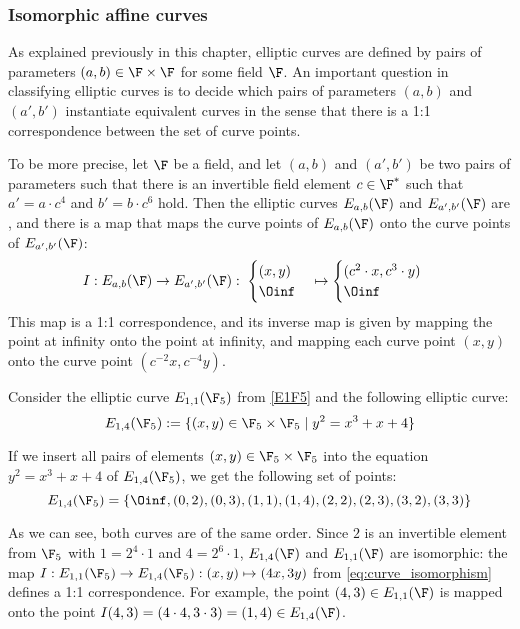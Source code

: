 \subsubsection{Isomorphic affine  curves}
\label{sec:isomorphic_curves} As explained previously in this chapter, elliptic curves are defined by pairs of parameters $(a, b)\in \F\times \F$ for some field $\F$. An important question in classifying elliptic curves is to decide which pairs of parameters $(a,b)$ and $(a',b')$ instantiate equivalent curves in the sense that there is a 1:1 correspondence between the set of curve points.

To be more precise, let $\F$ be a field, and let $(a,b)$ and $(a',b')$ be two pairs of parameters such that there is an invertible field element $c\in \F^*$ such that $a' = a\cdot c^4$ and $b' = b\cdot c^6$ hold. Then the elliptic curves $E_{a,b}(\F)$ and $E_{a',b'}(\F)$ are , and there is a map that maps the curve points of $E_{a,b}(\F)$ onto the curve points of $E_{a',b'}(\F)$:
\begin{equation}
\label{eq:curve_isomorphism}
I: E_{a,b}(\F) \to E_{a',b'}(\F):\; \begin{cases}(x,y)\\\Oinf\end{cases}
\mapsto \begin{cases}(c^2\cdot x,c^3\cdot y)\\\Oinf\end{cases}
\end{equation}
This map is a 1:1 correspondence, and its inverse map is given by mapping the point at infinity onto the point at infinity, and mapping each curve point $(x,y)$ onto the curve point $(c^{-2}x,c^{-4}y)$.
\begin{example}
\label{ex:isomorphic_E1F5}
 Consider the  elliptic curve $E_{1,1}(\F_5)$ from \examplename{} \ref{E1F5} and the following elliptic curve:
\begin{equation}
E_{1,4}(\F_5):= \{(x,y)\in \F_5\times \F_5 \; | \; y^2 = x^3 + x + 4 \}
\end{equation}

If we insert all pairs of elements $(x,y)\in \F_5\times \F_5$ into the  equation $y^2 = x^3 + x + 4$ of $E_{1,4}(\F_5)$, we get the following set of points:
\begin{equation}
E_{1,4}(\F_5) = \{
\Oinf, (0,2), (0,3), (1,1), (1,4), (2,2), (2,3), (3,2), (3,3)\}
\end{equation}

As we can see, both curves are of the same order. Since $2$ is an invertible element from $\F_5$ with $1 = 2^4\cdot 1$ and $4=2^6\cdot 1$, $E_{1,4}(\F)$ and $E_{1,1}(\F)$ are isomorphic: the map $I: E_{1,1}(\F_5)\to E_{1,4}(\F_5): (x,y)\mapsto (4x,3y)$ from \ref{eq:curve_isomorphism} defines a 1:1 correspondence. For example, the point $(4,3)\in E_{1,1}(\F)$ is mapped onto the point $I(4,3)=(4\cdot 4, 3\cdot 3) = (1,4)\in E_{1,4}(\F)$.
\end{example}
  
